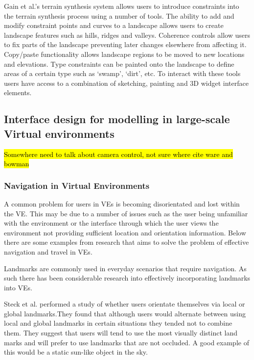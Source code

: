 \documentclass{sig-alternate-05-2015}
\begin{document}
 Gain et al.'s terrain synthesis system allows users to introduce constraints into the terrain synthesis process using a number of tools\cite{Gain2015}. The ability to add and modify constraint points and curves to a landscape allows users to create landscape features such as hills, ridges and valleys.  Coherence controls allow users to fix parts of the landscape preventing later changes elsewhere from affecting it. Copy/paste functionality allows landscape regions to be moved to new locations and elevations. Type constraints can be painted onto the landscape to define areas of a certain type such as `swamp', `dirt', etc. To interact with these tools users have access to a combination of sketching, painting and 3D widget interface elements. 

\subsection{Interface design for modelling in large-scale Virtual environments}
\hl{Somewhere need to talk about camera control, not sure where cite ware and bowman}
\subsubsection{Navigation in Virtual Environments}
A common problem for users in VEs is becoming disorientated and lost within the VE\cite{Darken1993}. This may be due to a number of issues such as the user being unfamiliar with the environment or the interface through which the user views the environment not providing sufficient location and orientation information. Below there are some examples from research that aims to solve the problem of effective navigation and travel in VEs.

Landmarks are commonly used in everyday scenarios that require navigation. As such there has been considerable research into effectively incorporating landmarks into VEs.

Steck et al. performed a study of whether users orientate themselves via local or global landmarks\cite{Steck2000}.They found that although users would alternate between using local and global landmarks in certain situations they tended not to combine them. They suggest that users will tend to use the most visually distinct land marks and will prefer to use landmarks that are not occluded. A good example of this would be a static sun-like object in the sky. %
\end{document}
